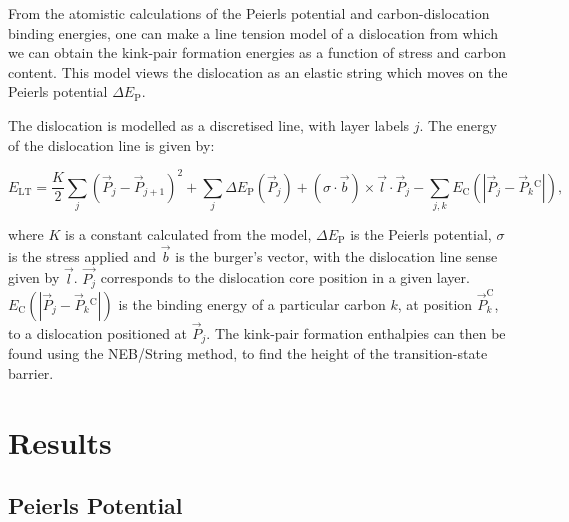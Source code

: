 \documentclass[a4paper,11pt]{article}
\begin{document}
From the atomistic calculations of the Peierls potential and carbon-dislocation binding energies, one can make a
line tension model of a dislocation from which we can obtain the kink-pair formation energies as
a function of stress and carbon content.  This model views the dislocation as an elastic string
which moves on the Peierls potential \(\Delta E_{\text{P}}\).

The dislocation is modelled as a discretised line, with layer labels \(j\). The energy of the
dislocation line is given by:

\[ E_{\text{LT}} = \frac{K}{2} \sum_j (\vec{P}_j - \vec{P}_{j+1} )^2  + \sum_j \Delta E_{\text{P}}  (\vec{P}_j) +
   (\sigma \cdot \vec{b}) \times \vec{l} \cdot \vec{P}_j  - \sum_{j,k} E_{\text{C}} (|\vec{P}_j-\vec{P}_k^{}^{\text{C}}|), \]

where \(K\) is a constant calculated from the model, \(\Delta E_{\text{P}}\) is the Peierls potential, \(\sigma\) is
the stress applied and \(\vec{b}\) is the burger's vector, with the dislocation line sense given by
\(\vec{l}\). \(\vec{P_{j}}\) corresponds to the dislocation core position in a given
layer. \(E_{\text{C}} (|\vec{P}_j-\vec{P}_k^{}^{\text{C}}|)\) is the binding energy of a particular carbon
\(k\), at position \(\vec{P}_k^{\text{C}}\), to a dislocation positioned at \(\vec{P}_j\). The kink-pair
formation enthalpies can then be found using the NEB/String method, to find the height of the transition-state
barrier. 

\section{Results}
\label{sec:org0b045c2}

\subsection{Peierls Potential}
\label{sec:orgb01a18e}
\end{document}
